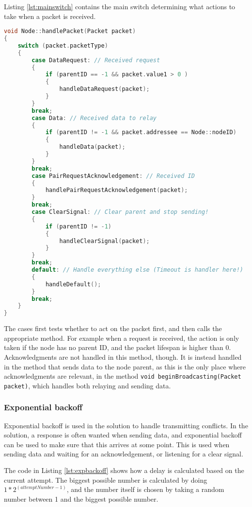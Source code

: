 Listing \ref{lst:mainswitch} contains the main switch determining what actions to take when a packet is received. 
\begin{lstlisting}[language=C,caption={The packet handling method.},label={lst:mainswitch}]
void Node::handlePacket(Packet packet)
{
    switch (packet.packetType)
    {
        case DataRequest: // Received request
        {
            if (parentID == -1 && packet.value1 > 0 )
            {
                handleDataRequest(packet);
            }
        }
        break;
        case Data: // Received data to relay
        {
            if (parentID != -1 && packet.addressee == Node::nodeID)
            {
                handleData(packet);
            }
        }
        break;
        case PairRequestAcknowledgement: // Received ID
        {
            handlePairRequestAcknowledgement(packet);
        }
        break;
        case ClearSignal: // Clear parent and stop sending!
        {
            if (parentID != -1)
            {
                handleClearSignal(packet);
            }
        }
        break;
        default: // Handle everything else (Timeout is handler here!)
        {
            handleDefault();
        }
        break;
    }
}
\end{lstlisting}
The cases first tests whether to act on the packet first, and then calls the appropriate method. For example when a request is received, the action is only taken if the node has no parent ID, and the packet lifespan is higher than 0. Acknowledgments are not handled in this method, though. It is instead handled in the method that sends data to the node parent, as this is the only place where acknowledgments are relevant, in the method \texttt{void beginBroadcasting(Packet packet)}, which handles both relaying and sending data.


\subsubsection*{Exponential backoff}
Exponential backoff is used in the solution to handle transmitting conflicts. In the solution, a response is often wanted when sending data, and exponential backoff can be used to make sure that this arrives at some point. This is used when sending data and waiting for an acknowledgement, or listening for a clear signal.

The code in Listing \ref{lst:expbackoff} shows how a delay is calculated based on the current attempt.
The biggest possible number is calculated by doing $1 * 2^{(attemptNumber-1)}$, and the number itself is chosen by taking a random number between 1 and the biggest possible number.

